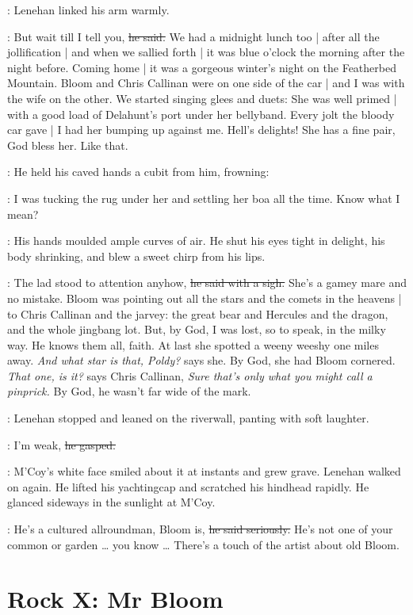 :
Lenehan linked his arm warmly.

\lenehan:
But wait till I tell you,
\sout{he said.}
We had a midnight lunch too |
after all the jollification |
and when we sallied forth |
it was blue o'clock the morning after the night before.
Coming home |
it was a gorgeous winter's night on the Featherbed Mountain.
Bloom and Chris Callinan were on one side of the car |
and I was with the wife on the other.
We started singing glees and duets:
She was well primed |
with a good load of Delahunt's port under her bellyband.
Every jolt the bloody car gave |
I had her bumping up against me.
Hell's delights!
She has a fine pair, God bless her.
Like that.

:
He held his caved hands a cubit from him,
frowning:

\lenehan:
I was tucking the rug under her
and settling her boa all the time.
Know what I mean?

:
His hands moulded ample curves of air.
He shut his eyes tight in delight,
his body shrinking,
and blew a sweet chirp from his lips.

\lenehan:
The lad stood to attention anyhow,
\sout{he said with a sigh.}
She's a gamey mare and no mistake.
Bloom was pointing out all the stars and the comets in the heavens |
to Chris Callinan and the jarvey:
the great bear and Hercules and the dragon,
and the whole jingbang lot.
But, by God, I was lost,
so to speak,
in the milky way.
He knows them all, faith.
At last she spotted a weeny weeshy one miles away.
\emph{And what star is that, Poldy?}
says she.
By God, she had Bloom cornered.
\emph{That one, is it?}
says Chris Callinan,
\emph{Sure that's only what you might call a pinprick.}
By God, he wasn't far wide of the mark.

:
Lenehan stopped and leaned on the riverwall,
panting with soft laughter.

\lenehan:
I'm weak,
\sout{he gasped.}

:
M'Coy's white face smiled about it at instants and grew grave.
Lenehan walked on again.
He lifted his yachtingcap and scratched his hindhead rapidly.
He glanced sideways in the sunlight at M'Coy.

\lenehan:
He's a cultured allroundman,
Bloom is,
\sout{he said seriously.}
He's not one of your common or garden \ldots
you know \ldots
There's a touch of the artist about old Bloom.


\section*{Rock X: Mr Bloom}


